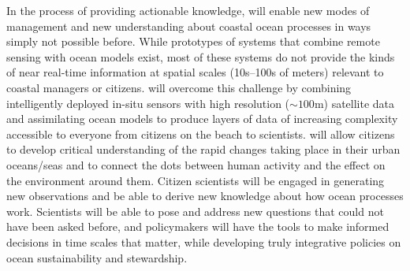 



In the process of providing actionable knowledge, \pro will enable new
modes of management and new understanding about coastal ocean
processes in ways simply not possible before.  While prototypes of
systems that combine remote sensing with ocean models exist, most of
these systems do not provide the kinds of near real-time information
at spatial scales (10s--100s of meters) relevant to coastal managers
or citizens.  \pro will overcome this challenge by combining
intelligently deployed in-situ sensors with high resolution
($\sim100$m) satellite data and assimilating ocean models to produce
layers of data of increasing complexity accessible to everyone from
citizens on the beach to scientists. \pro will allow citizens to
develop critical understanding of the rapid changes taking place in
their urban oceans/seas and to connect the dots between human activity
and the effect on the environment around them. Citizen scientists will
be engaged in generating new observations and be able to derive new
knowledge about how ocean processes work. Scientists will be able to
pose and address new questions that could not have been asked before,
and policymakers will have the tools to make informed decisions in
time scales that matter, while developing truly integrative policies
on ocean sustainability and stewardship.


